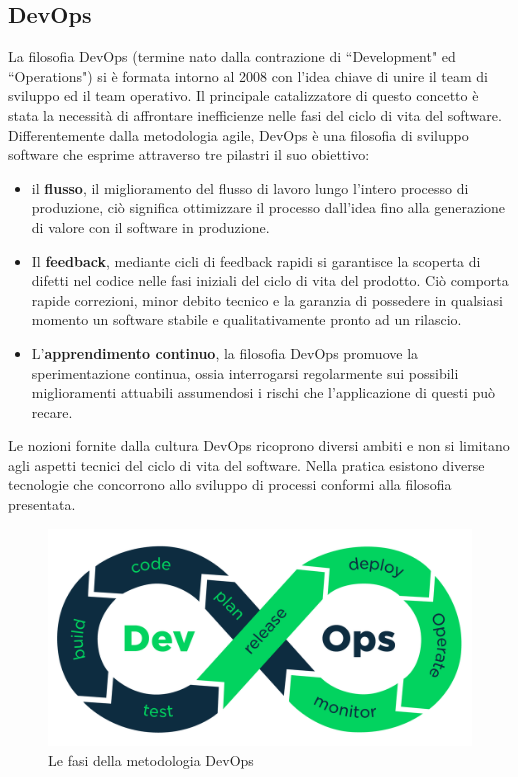 \subsection{DevOps}
La filosofia DevOps (termine nato dalla contrazione di ``Development" ed ``Operations") si è formata intorno al 2008 con l'idea chiave di unire il team di sviluppo ed il team operativo. Il principale catalizzatore di questo concetto è stata la necessità di affrontare inefficienze nelle fasi del ciclo di vita del software. Differentemente dalla metodologia agile, DevOps è una filosofia di sviluppo software che esprime attraverso tre pilastri il suo obiettivo:

\begin{itemize}
	\item il \textbf{flusso}, il miglioramento del flusso di lavoro lungo l'intero processo di produzione, ciò significa ottimizzare il processo dall'idea fino alla generazione di valore con il software in produzione.
	\item Il \textbf{feedback}, mediante cicli di feedback rapidi si garantisce la scoperta di difetti nel codice nelle fasi iniziali del ciclo di vita del prodotto. Ciò comporta rapide correzioni, minor debito tecnico e la garanzia di possedere in qualsiasi momento un software stabile e qualitativamente pronto ad un rilascio.
	\item L'\textbf{apprendimento continuo}, la filosofia DevOps promuove la sperimentazione continua, ossia interrogarsi regolarmente sui possibili miglioramenti attuabili assumendosi i rischi che l'applicazione di questi può recare.
\end{itemize}

Le nozioni fornite dalla cultura DevOps ricoprono diversi ambiti e non si limitano agli aspetti tecnici del ciclo di vita del software. Nella pratica esistono diverse tecnologie che concorrono allo sviluppo di processi conformi alla filosofia presentata.

\begin{figure}[htb]
	\centering
	\includegraphics[width=.8\linewidth]{figures/devops-process.png}
	\caption{Le fasi della metodologia DevOps}
	\label{fig:devops-process}
\end{figure}

